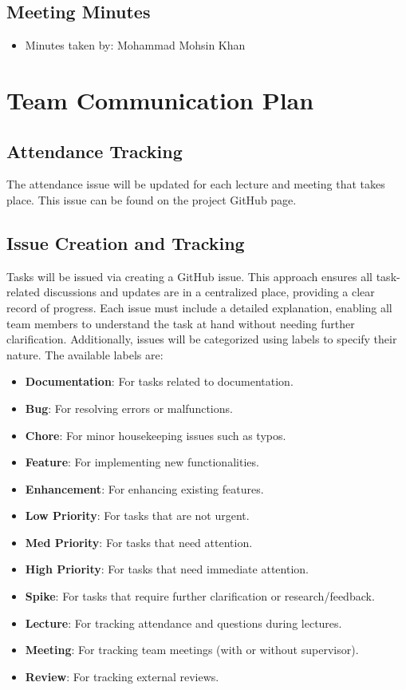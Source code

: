 \documentclass{article}
\begin{document}
\subsection*{Meeting Minutes}

\begin{itemize}
    \item Minutes taken by: Mohammad Mohsin Khan
\end{itemize}



\section{Team Communication Plan}

\subsection{Attendance Tracking}

The attendance issue will be updated for each lecture and meeting that takes place. This issue 
can be found on the project GitHub page.

\subsection{Issue Creation and Tracking}

Tasks will be issued via creating a GitHub issue. This approach ensures all task-related 
discussions and updates are in a centralized place, providing a clear record of progress. 
Each issue must include a detailed explanation, enabling all team members to understand the 
task at hand without needing further clarification. Additionally, issues will be categorized 
using labels to specify their nature. The available labels are:

\begin{itemize}
    \item \textbf{Documentation}: For tasks related to documentation.
    \item \textbf{Bug}: For resolving errors or malfunctions.
    \item \textbf{Chore}: For minor housekeeping issues such as typos.
    \item \textbf{Feature}: For implementing new functionalities.
    \item \textbf{Enhancement}: For enhancing existing features.
    \item \textbf{Low Priority}: For tasks that are not urgent.
    \item \textbf{Med Priority}: For tasks that need attention.
    \item \textbf{High Priority}: For tasks that need immediate attention.
    \item \textbf{Spike}: For tasks that require further clarification or research/feedback.
    \item \textbf{Lecture}: For tracking attendance and questions during lectures.
    \item \textbf{Meeting}: For tracking team meetings (with or without supervisor).
    \item \textbf{Review}: For tracking external reviews.
\end{itemize}
\end{document}

